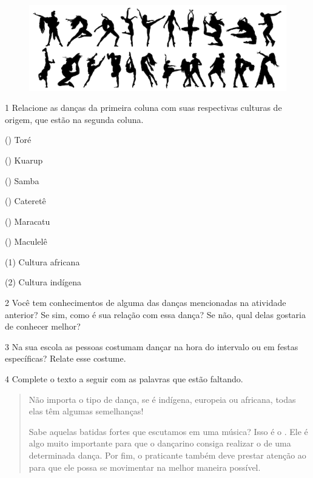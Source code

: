\begin{figure}[htpb!]
\includegraphics[width=\textwidth]{./imgs/img11.png}
\end{figure}


\num{1} Relacione as danças da primeira coluna com suas respectivas culturas de
  origem, que estão na segunda coluna.

\begin{multicols}{2}
() Toré

() Kuarup

() Samba

() Cateretê

() Maracatu

() Maculelê

\columnbreak

(1) Cultura africana\medskip

(2) Cultura indígena
\end{multicols}


\num{2} Você tem conhecimentos de alguma das danças mencionadas na atividade anterior? Se sim, como é sua relação com essa dança? Se não, qual delas gostaria de conhecer melhor?


\num{3} Na sua escola as pessoas costumam dançar na hora do intervalo ou em festas específicas? Relate esse costume.


\num{4} Complete o texto a seguir com as palavras que estão faltando.

\begin{quote}
Não importa o tipo de dança, se é indígena, europeia ou africana, todas
elas têm algumas semelhanças!

Sabe aquelas batidas fortes que escutamos em uma música? Isso é o .
Ele é algo muito importante para que o dançarino consiga realizar o  de
uma determinada dança. Por fim, o praticante também deve prestar atenção ao
 para que ele possa se movimentar na melhor maneira possível.
\end{quote}

